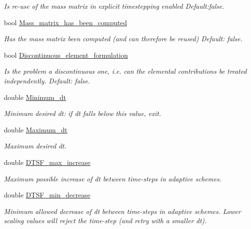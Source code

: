 \begin{DoxyCompactItemize}
\begin{DoxyCompactList}\small\item\em Is re-\/use of the mass matrix in explicit timestepping enabled Default\+:false. \end{DoxyCompactList}\item 
bool \hyperlink{classoomph_1_1Problem_a6067c6d344363a073fb8d02a99fb7ed0}{Mass\+\_\+matrix\+\_\+has\+\_\+been\+\_\+computed}
\begin{DoxyCompactList}\small\item\em Has the mass matrix been computed (and can therefore be reused) Default\+: false. \end{DoxyCompactList}\item 
bool \hyperlink{classoomph_1_1Problem_a97ca0078fff6adca318835c11503dc2d}{Discontinuous\+\_\+element\+\_\+formulation}
\begin{DoxyCompactList}\small\item\em Is the problem a discontinuous one, i.\+e. can the elemental contributions be treated independently. Default\+: false. \end{DoxyCompactList}\item 
double \hyperlink{classoomph_1_1Problem_ad7456318933aa01114dc78498bfd6d79}{Minimum\+\_\+dt}
\begin{DoxyCompactList}\small\item\em Minimum desired dt\+: if dt falls below this value, exit. \end{DoxyCompactList}\item 
double \hyperlink{classoomph_1_1Problem_a7b5fde48b00a7fdc5f1fbbee138d0414}{Maximum\+\_\+dt}
\begin{DoxyCompactList}\small\item\em Maximum desired dt. \end{DoxyCompactList}\item 
double \hyperlink{classoomph_1_1Problem_aaaeab9469b342a3b849ee5f2ef7051f3}{D\+T\+S\+F\+\_\+max\+\_\+increase}
\begin{DoxyCompactList}\small\item\em Maximum possible increase of dt between time-\/steps in adaptive schemes. \end{DoxyCompactList}\item 
double \hyperlink{classoomph_1_1Problem_abbb93979ed99d40eb845ba7296355965}{D\+T\+S\+F\+\_\+min\+\_\+decrease}
\begin{DoxyCompactList}\small\item\em Minimum allowed decrease of dt between time-\/steps in adaptive schemes. Lower scaling values will reject the time-\/step (and retry with a smaller dt). \end{DoxyCompactList}\item 

\end{DoxyCompactItemize}
